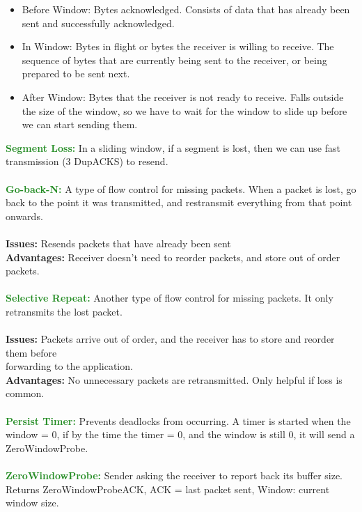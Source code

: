 \documentclass[a4paper,10pt]{article}
\begin{document}
\begin{itemize}
	\item Before Window: Bytes acknowledged. Consists of data that has already been sent and successfully acknowledged.
	\item In Window: Bytes in flight or bytes the receiver is willing to receive. The sequence of bytes that are currently being sent to the receiver, or being prepared to be sent next.
	\item After Window: Bytes that the receiver is not ready to receive. Falls outside the size of the window, so we have to wait for the window to slide up before we can start sending them.
\end{itemize}
\textcolor{ForestGreen}{\textbf{Segment Loss:}} In a sliding window, if a segment is lost, then we can use fast transmission (3 DupACKS) to resend. \\\\
\textcolor{ForestGreen}{\textbf{Go-back-N:}} A type of flow control for missing packets. When a packet is lost, go back to the point it was transmitted, and restransmit everything from that point onwards. \\\\
\indent \textbf{Issues:} Resends packets that have already been sent \\
\indent \textbf{Advantages:} Receiver doesn't need to reorder packets, and store out of order packets. \\\\
\textcolor{ForestGreen}{\textbf{Selective Repeat:}} Another type of flow control for missing packets. It only retransmits the lost packet. \\\\
\indent \textbf{Issues:} Packets arrive out of order, and the receiver has to store and reorder them before \\ 
\indent forwarding to the application. \\
\indent \textbf{Advantages:} No unnecessary packets are retransmitted. Only helpful if loss is common.\\\\
\textcolor{ForestGreen}{\textbf{Persist Timer:}} Prevents deadlocks from occurring. A timer is started when the window = 0, if by the time the timer = 0, and the window is still 0, it will send a ZeroWindowProbe. \\\\
\textcolor{ForestGreen}{\textbf{ZeroWindowProbe:}} Sender asking the receiver to report back its buffer size. Returns ZeroWindowProbeACK, ACK = last packet sent, Window: current window size. \\\\
\end{document}
